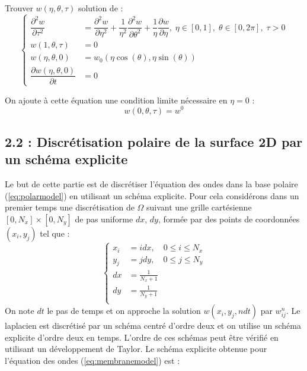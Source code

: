 \documentclass[a4,12pt]{article}
\begin{document}
		  Trouver $w(\eta,\theta,\tau)$ solution de :
		  \begin{equation}
		    \left\{
		      \begin{array}{rl}
			\dfrac{\partial^2 w}{\partial \tau^2} & =   \dfrac{\partial^2 w}{\partial \eta^2}+\dfrac{1}
			{\eta^2}\dfrac{\partial^2 w}{\partial \theta^2}+\dfrac{1}{\eta}\dfrac{\partial w}{\partial \eta},\;\eta\in[0,1],\;		\theta\in[0,2\pi],\;\tau>0\\
			w(1,\theta,\tau)& = 0  \\
			w(\eta,\theta,0)& = w_0(\eta \cos(\theta),\eta \sin (\theta)) \\
			\dfrac{\partial w(\eta,\theta,0)}{\partial t} & = 0
		      \end{array}
		      \right.
		      \label{eq:polarmodel}
		    \end{equation}

		    On ajoute à cette équation une condition limite nécessaire  en $\eta=0$ :
		    \[
		      w(0,\theta,\tau)=w^0
		    \]


		    \subsection*{2.2 : Discrétisation polaire de la surface 2D par un schéma explicite }
		    Le but de cette partie est de discrétiser l'équation des ondes dans la base polaire (\ref{eq:polarmodel}) en utilisant un schéma explicite. Pour cela considérons dans un premier temps une discrétisation de $\Omega $ suivant une grille cartésienne $[0,N_x]\times [0,N_y]$ de pas uniforme $dx$, $dy$, formée par des points de coordonnées $(x_i,y_j)$ tel que :
		    \begin{equation*}{}
		      \left\{
			\begin{array}{rl}
			  x_i &=i dx,\quad 0\leq i \leq N_x \\
			  y_j &=j dy,\quad  0\leq j \leq N_y \\
			  dx & =\frac{1}{N_x+1}\\
			  dy &=\frac{1}{N_y+1}\\
			\end{array}
			\right.
		      \end{equation*}
		      On note $dt$ le pas de temps et on approche la solution $w(x_i,y_j,ndt)$ par $w_{ij}^{n}$. Le laplacien est discrétisé  par un schéma centré d'ordre deux  et on utilise un schéma explicite d'ordre deux en temps. L'ordre de ces schémas peut être vérifié en utilisant un développement de Taylor. Le schéma explicite obtenue pour l'équation des ondes (\ref{eq:membranemodel}) est :
\end{document}
